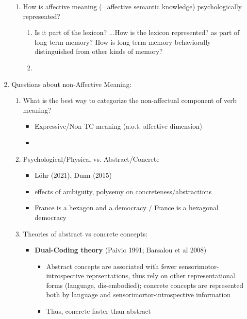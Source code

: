\documentclass[12pt,letterpaper,table,svgnames,dvipsnames]{article}
\begin{document}
\begin{enumerate}[noitemsep]
\begin{enumerate}[noitemsep]
            \item How is affective meaning (=affective semantic knowledge) psychologically represented?   
                \begin{enumerate}[noitemsep]
                    \item Is it part of the lexicon?
                        ...How is the lexicon represented? as part of long-term memory? How is long-term memory behaviorally distinguished from other kinds of memory?
                    \item 
                \end{enumerate}
            
        \end{enumerate}   
            
        \item Questions about non-Affective Meaning:
            \begin{enumerate}[noitemsep]
                \item What is the best way to categorize the non-affectual component of verb meaning?
                    \begin{itemize}[noitemsep]
                        \item Expressive/Non-TC meaning (a.o.t. affective dimension)
                        \item 
                    \end{itemize}
                \item Psychological/Physical vs. Abstract/Concrete
                    \begin{itemize}[noitemsep]
                        \item Löhr (2021), Dunn (2015)
                        \item effects of ambiguity, polysemy on concreteness/abstractions
                        \item France is a hexagon and a democracy / \* France is a hexagonal democracy
                    \end{itemize}
                \item Theories of abstract vs concrete concepts:
                    \begin{itemize}
                        \item \textbf{Dual-Coding theory} (Paivio 1991; Barsalou et al 2008)\\
                            \begin{itemize}
                                \item Abstract concepts are associated with fewer sensorimotor-introspective reprsentations, thus rely on other representational forms (language, dis-embodied); concrete concepts are represented both by language and sensorimortor-introspective information
                                \item Thus, concrete faster than abstract
                            \end{itemize}


\end{itemize}
\end{enumerate}
\end{enumerate}
\end{document}
